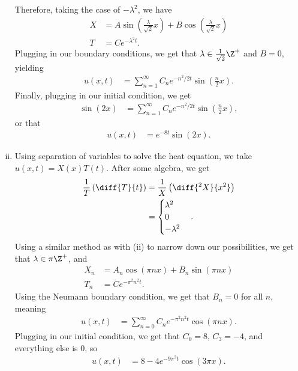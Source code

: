 \documentclass[10pt]{mypackage}
\begin{document}
\begin{solution}
\begin{enumerate}[(i)]
      Therefore, taking the case of $-\lambda^2$, we have
      \begin{align*}
        X &= A\sin\left( \frac{\lambda}{\sqrt{2}} x \right) + B\cos\left( \frac{\lambda}{\sqrt{2}} x \right)\\
        T &= Ce^{-\lambda^2 t}.
      \end{align*}
      Plugging in our boundary conditions, we get that $\lambda\in \frac{1}{\sqrt{2}}\Z^{+}$ and $B = 0$, yielding
      \begin{align*}
        u\left( x,t \right) &= \sum_{n=1}^{\infty}C_ne^{-n^2/2 t}\sin\left( \frac{n}{2}x \right).
      \end{align*}
      Finally, plugging in our initial condition, we get
      \begin{align*}
        \sin\left( 2x \right) &= \sum_{n=1}^{\infty}C_ne^{-n^2/2 t}\sin\left( \frac{n}{2}x \right),
      \end{align*}
      or that 
      \begin{align*}
        u\left( x,t \right) &= e^{-8t}\sin\left( 2x \right).
      \end{align*}
    \item Using separation of variables to solve the heat equation, we take $u\left( x,t \right) = X(x)T(t)$. After some algebra, we get
      \begin{align*}
        \frac{1}{T}\left( \diff{T}{t} \right) &= \frac{1}{X} \left( \diff{^2X}{x^2} \right)\\
                                              &= \begin{cases}
                                                \lambda^2 \\
                                                0\\
                                                -\lambda^2
                                              \end{cases}.
      \end{align*}
      Using a similar method as with (ii) to narrow down our possibilities, we get that $\lambda\in \pi\Z^+$, and
      \begin{align*}
        X_n &= A_n\cos\left( \pi n x \right) + B_n\sin\left( \pi n x \right)\\
        T_n &= Ce^{-\pi^2 n^2 t}.
      \end{align*}
      Using the Neumann boundary condition, we get that $B_n = 0$ for all $n$, meaning
      \begin{align*}
        u\left( x,t \right) &= \sum_{n=0}^{\infty}C_ne^{-\pi^2n^2 t}\cos\left( \pi n x \right).
      \end{align*}
      Plugging in our initial condition, we get that $C_0 = 8$, $C_3 = -4$, and everything else is $0$, so
      \begin{align*}
        u\left( x,t \right) &= 8 - 4e^{-9\pi^2 t}\cos\left( 3\pi x \right).
      \end{align*}
      
  \end{enumerate}
\end{solution}
\end{document}
